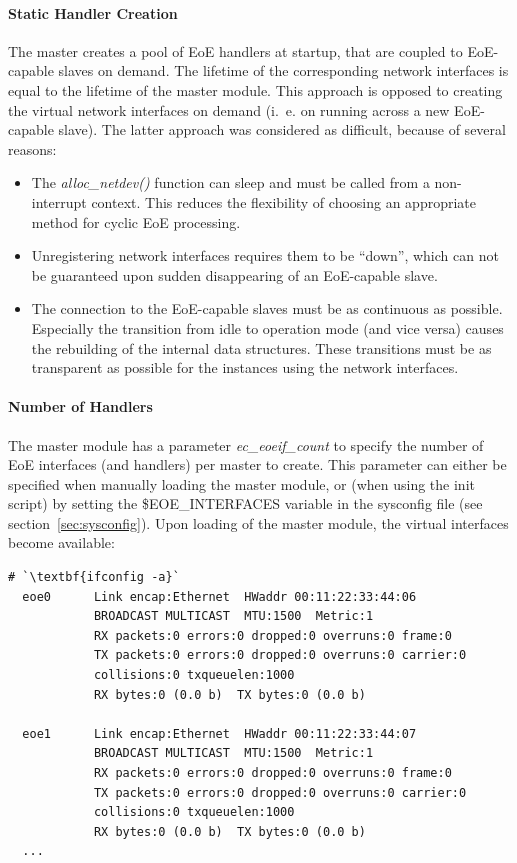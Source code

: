 \documentclass[a4paper,12pt,BCOR6mm,bibtotoc,idxtotoc]{scrbook}
\begin{document}
\paragraph{Static Handler Creation}

The master creates a pool of EoE handlers at startup, that are coupled
to EoE-capable slaves on demand. The lifetime of the corresponding
network interfaces is equal to the lifetime of the master module.
This approach is opposed to creating the virtual network interfaces on
demand (i.~e. on running across a new EoE-capable slave). The latter
approach was considered as difficult, because of several reasons:

\begin{itemize}
\item The \textit{alloc\_netdev()} function can sleep and must be
  called from a non-interrupt context. This reduces the flexibility of
  choosing an appropriate method for cyclic EoE processing.
\item Unregistering network interfaces requires them to be ``down'',
  which can not be guaranteed upon sudden disappearing of an
  EoE-capable slave.
\item The connection to the EoE-capable slaves must be as continuous
  as possible. Especially the transition from idle to operation mode
  (and vice versa) causes the rebuilding of the internal data
  structures. These transitions must be as transparent as possible for
  the instances using the network interfaces.
\end{itemize}

\paragraph{Number of Handlers}

The master module has a parameter \textit{ec\_eoeif\_count} to specify
the number of EoE interfaces (and handlers) per master to create. This
parameter can either be specified when manually loading the master
module, or (when using the init script) by setting the
\$EOE\_INTERFACES variable in the sysconfig file (see
section~\ref{sec:sysconfig}). Upon loading of the master module, the
virtual interfaces become available:

\begin{lstlisting}[gobble=2]
  # `\textbf{ifconfig -a}`
  eoe0      Link encap:Ethernet  HWaddr 00:11:22:33:44:06
            BROADCAST MULTICAST  MTU:1500  Metric:1
            RX packets:0 errors:0 dropped:0 overruns:0 frame:0
            TX packets:0 errors:0 dropped:0 overruns:0 carrier:0
            collisions:0 txqueuelen:1000
            RX bytes:0 (0.0 b)  TX bytes:0 (0.0 b)

  eoe1      Link encap:Ethernet  HWaddr 00:11:22:33:44:07
            BROADCAST MULTICAST  MTU:1500  Metric:1
            RX packets:0 errors:0 dropped:0 overruns:0 frame:0
            TX packets:0 errors:0 dropped:0 overruns:0 carrier:0
            collisions:0 txqueuelen:1000
            RX bytes:0 (0.0 b)  TX bytes:0 (0.0 b)
  ...
\end{lstlisting}
\end{document}
